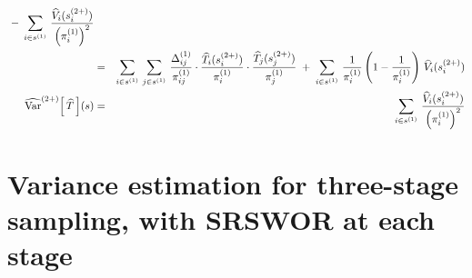 \begin{corollary}
\begin{eqnarray*}
\;-\;\sum_{i\in s^{(1)}}\,\dfrac{\widehat{V}_{i}(s^{(2+)}_{i})}{\left(\pi^{(1)}_{i}\right)^{2}}
\\
&=&
\sum_{i\in s^{(1)}}\,\sum_{j\in s^{(1)}}\,
\dfrac{\Delta^{(1)}_{ij}}{\pi^{(1)}_{ij}}
\cdot
\dfrac{\widehat{T}_{i}(s^{(2+)}_{i})}{\pi^{(1)}_{i}}
\cdot
\dfrac{\widehat{T}_{j}(s^{(2+)}_{j})}{\pi^{(1)}_{j}}
\;+\;\sum_{i\in s^{(1)}}\,\dfrac{1}{\pi^{(1)}_{i}} \left(1 - \dfrac{1}{\pi^{(1)}_{i}}\right) \, \widehat{V}_{i}(s^{(2+)}_{i})
\\
\widehat{\textnormal{Var}}^{(2+)}\!\left[\,\widehat{T}\,\right]\!(s)
&=&\sum_{i\in s^{(1)}}\,\dfrac{\widehat{V}_{i}(s^{(2+)}_{i})}{\left(\pi^{(1)}_{i}\right)^{2}}
\end{eqnarray*}
\end{corollary}


\clearpage
\section{Variance estimation for three-stage sampling, with SRSWOR at each stage}
\setcounter{theorem}{0}
\setcounter{equation}{0}

